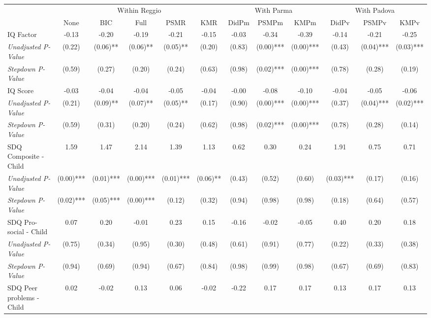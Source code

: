 \begin{tabular}{l c c c c c c c c c c c}
\toprule
& \multicolumn{5}{c}{Within Reggio} & \multicolumn{3}{c}{With Parma} & \multicolumn{3}{c}{With Padova} \\\cmidrule(lr){2-6} \cmidrule(lr){7-9} \cmidrule(lr){10-12}
 & None & BIC & Full & PSMR & KMR & DidPm & PSMPm & KMPm & DidPv & PSMPv & KMPv \\
\midrule
IQ Factor & -0.13 & -0.20 & -0.19 & -0.21 & -0.15 & -0.03 & -0.34 & -0.39 & -0.14 & -0.21 & -0.25 \\
\quad \textit{Unadjusted P-Value} & (0.22) & (0.06)** & (0.06)** & (0.05)** & (0.20) & (0.83) & (0.00)*** & (0.00)*** & (0.43) & (0.04)*** & (0.03)*** \\
\quad \textit{Stepdown P-Value} & (0.59) & (0.27) & (0.20) & (0.24) & (0.63) & (0.98) & (0.02)*** & (0.00)*** & (0.78) & (0.28) & (0.19) \\
IQ Score & -0.03 & -0.04 & -0.04 & -0.05 & -0.04 & -0.00 & -0.08 & -0.10 & -0.04 & -0.05 & -0.06 \\
\quad \textit{Unadjusted P-Value} & (0.21) & (0.09)** & (0.07)** & (0.05)** & (0.17) & (0.90) & (0.00)*** & (0.00)*** & (0.37) & (0.04)*** & (0.02)*** \\
\quad \textit{Stepdown P-Value} & (0.59) & (0.31) & (0.20) & (0.24) & (0.62) & (0.98) & (0.02)*** & (0.00)*** & (0.78) & (0.28) & (0.14) \\
SDQ Composite - Child & 1.59 & 1.47 & 2.14 & 1.39 & 1.13 & 0.62 & 0.30 & 0.24 & 1.91 & 0.75 & 0.71 \\
\quad \textit{Unadjusted P-Value} & (0.00)*** & (0.01)*** & (0.00)*** & (0.01)*** & (0.06)** & (0.43) & (0.52) & (0.60) & (0.03)*** & (0.17) & (0.16) \\
\quad \textit{Stepdown P-Value} & (0.02)*** & (0.05)*** & (0.00)*** & (0.12) & (0.32) & (0.94) & (0.98) & (0.98) & (0.18) & (0.64) & (0.57) \\
SDQ Pro-social - Child & 0.07 & 0.20 & -0.01 & 0.23 & 0.15 & -0.16 & -0.02 & -0.05 & 0.40 & 0.20 & 0.18 \\
\quad \textit{Unadjusted P-Value} & (0.75) & (0.34) & (0.95) & (0.30) & (0.48) & (0.61) & (0.91) & (0.77) & (0.22) & (0.33) & (0.38) \\
\quad \textit{Stepdown P-Value} & (0.94) & (0.69) & (0.94) & (0.67) & (0.84) & (0.98) & (0.99) & (0.98) & (0.67) & (0.69) & (0.83) \\
SDQ Peer problems - Child & 0.02 & -0.02 & 0.13 & 0.06 & -0.02 & -0.22 & 0.17 & 0.17 & 0.13 & 0.17 & 0.13 \\

\end{tabular}
